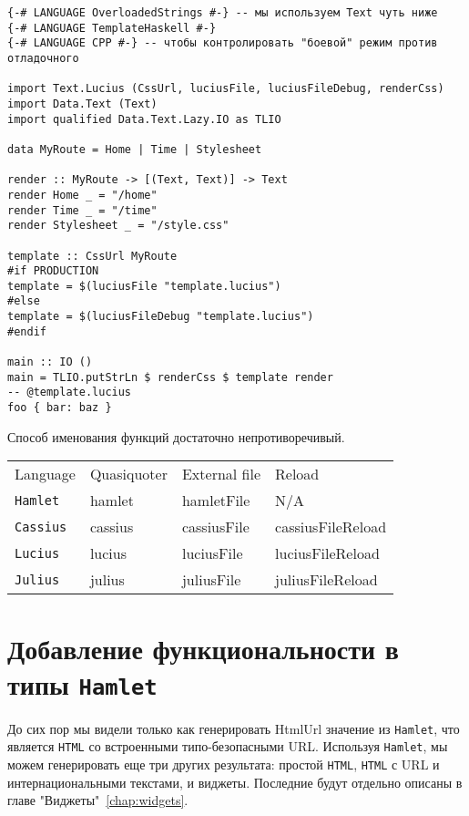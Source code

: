 \begin{lstlisting}[caption=Внешние файлы]
{-# LANGUAGE OverloadedStrings #-} -- мы используем Text чуть ниже
{-# LANGUAGE TemplateHaskell #-}
{-# LANGUAGE CPP #-} -- чтобы контролировать "боевой" режим против отладочного

import Text.Lucius (CssUrl, luciusFile, luciusFileDebug, renderCss)
import Data.Text (Text)
import qualified Data.Text.Lazy.IO as TLIO

data MyRoute = Home | Time | Stylesheet

render :: MyRoute -> [(Text, Text)] -> Text
render Home _ = "/home"
render Time _ = "/time"
render Stylesheet _ = "/style.css"

template :: CssUrl MyRoute
#if PRODUCTION
template = $(luciusFile "template.lucius")
#else
template = $(luciusFileDebug "template.lucius")
#endif

main :: IO ()
main = TLIO.putStrLn $ renderCss $ template render
-- @template.lucius
foo { bar: baz }
\end{lstlisting}

Способ именования функций достаточно непротиворечивый.
\begin{tabular}{l l l l}
Language & Quasiquoter & External file & Reload \\
\texttt{Hamlet}   & hamlet      & hamletFile    & N/A    \\
\texttt{Cassius}  & cassius     & cassiusFile   & cassiusFileReload \\
\texttt{Lucius}   & lucius      & luciusFile    & luciusFileReload \\
\texttt{Julius}   & julius      & juliusFile    & juliusFileReload \\
\end{tabular}

\section{Добавление функциональности в типы \texttt{Hamlet}}
До сих пор мы видели только как генерировать HtmlUrl значение из
\texttt{Hamlet}, что является \texttt{HTML} со встроенными типо-безопасными
URL. Используя \texttt{Hamlet}, мы можем генерировать еще три других
результата: простой \texttt{HTML}, \texttt{HTML} с URL и интернациональными
текстами, и виджеты.  Последние будут отдельно описаны в главе
"Виджеты"~\ref{chap:widgets}.

